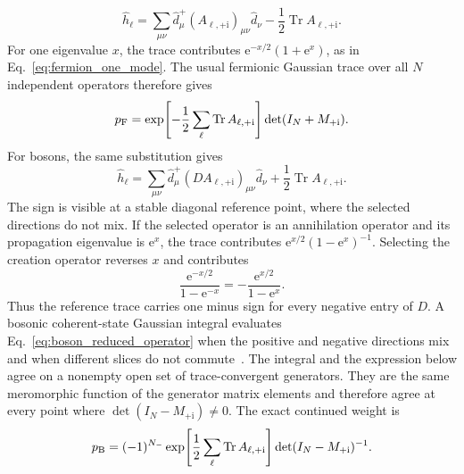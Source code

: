 \documentclass[onecolumn,aps,prb,amsmath,amssymb,superscriptaddress,longbibliography]{revtex4-2}
\newcommand{\Tr}{\operatorname{Tr}}
\newcommand{\ee}{\mathrm{e}}
\newcommand{\ii}{\mathrm{i}}
\begin{document}
\begin{equation}
    \hat h_\ell
    =\sum_{\mu\nu}\hat d_\mu^+
      (A_{\ell,+\ii})_{\mu\nu}\hat d_\nu
     -\frac12\Tr A_{\ell,+\ii}.
    \label{eq:fermion_reduced_operator}
\end{equation}
For one eigenvalue \(x\), the trace contributes \(\ee^{-x/2}(1+\ee^x)\), as in Eq.~\eqref{eq:fermion_one_mode}.  The usual fermionic Gaussian trace over all \(N\) independent operators therefore gives
\begin{equation}
    p_{\rm F}=
    \exp\!\left[-\frac12\sum_\ell\Tr A_{\ell,+\ii}\right]
    \det(I_N+M_{+\ii}).
    \label{eq:fermion_reduced_weight}
\end{equation}
For bosons, the same substitution gives
\begin{equation}
    \hat h_\ell
    =\sum_{\mu\nu}\hat d_\mu^+
      (D A_{\ell,+\ii})_{\mu\nu}\hat d_\nu
     +\frac12\Tr A_{\ell,+\ii}.
    \label{eq:boson_reduced_operator}
\end{equation}
The sign is visible at a stable diagonal reference point, where the selected directions do not mix.  If the selected operator is an annihilation operator and its propagation eigenvalue is \(\ee^x\), the trace contributes \(\ee^{x/2}(1-\ee^x)^{-1}\).  Selecting the creation operator reverses \(x\) and contributes
\begin{equation}
    \frac{\ee^{-x/2}}{1-\ee^{-x}}
    =-\frac{\ee^{x/2}}{1-\ee^x}.
    \label{eq:boson_reversed_mode}
\end{equation}
Thus the reference trace carries one minus sign for every negative entry of \(D\).  A bosonic coherent-state Gaussian integral evaluates Eq.~\eqref{eq:boson_reduced_operator} when the positive and negative directions mix and when different slices do not commute~\cite{munn1978ensemble}.  The integral and the expression below agree on a nonempty open set of trace-convergent generators.  They are the same meromorphic function of the generator matrix elements and therefore agree at every point where \(\det(I_N-M_{+\ii})\ne0\).  The exact continued weight is
\begin{equation}
    p_{\rm B}=(-1)^{N_-}
    \exp\!\left[\frac12\sum_\ell\Tr A_{\ell,+\ii}\right]
    \det(I_N-M_{+\ii})^{-1}.
    \label{eq:boson_reduced_weight}
\end{equation}
\end{document}
